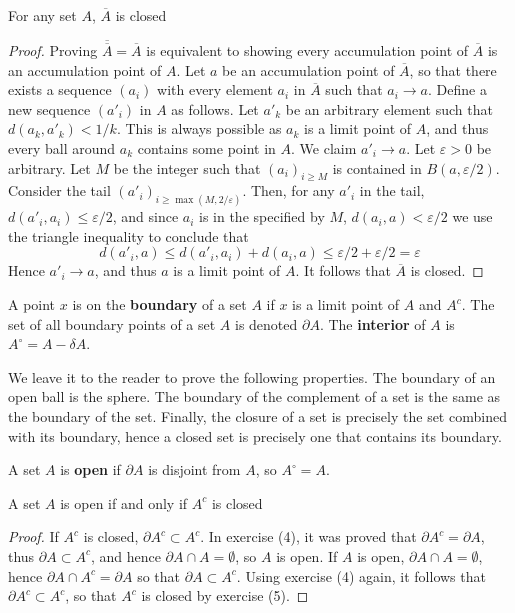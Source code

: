 \begin{lemma}
  For any set $A$, $\overline{A}$ is closed
\end{lemma}
\begin{proof}
  Proving $\overline{\overline{A}} = \overline{A}$ is equivalent to showing every accumulation point of $\overline{A}$ is an accumulation point of $A$. Let $a$ be an accumulation point of $\overline{A}$, so that there exists a sequence $(a_i)$ with every element $a_i$ in $\overline{A}$ such that $a_i \to a$. Define a new sequence $(a'_i)$ in $A$ as follows. Let $a'_k$ be an arbitrary element such that $d(a_k, a'_k) < 1/k$. This is always possible as $a_k$ is a limit point of $A$, and thus every ball around $a_k$ contains some point in $A$. We claim $a'_i \to a$. Let $\varepsilon > 0$ be arbitrary. Let $M$ be the integer such that $(a_i)_{i \geq M}$ is contained in $B(a,\varepsilon/2)$. Consider the tail $(a'_i)_{i \geq \max(M,2/\varepsilon)}$. Then, for any $a'_i$ in the tail, $d(a'_i, a_i) \leq \varepsilon/2$, and since $a_i$ is in the specified by $M$, $d(a_i, a) < \varepsilon/2$ we use the triangle inequality to conclude that
  \[ d(a'_i, a) \leq d(a'_i, a_i) + d(a_i, a) \leq \varepsilon/2 + \varepsilon/2 = \varepsilon \]
  Hence $a'_i \to a$, and thus $a$ is a limit point of $A$. It follows that $\overline{A}$ is closed.
\end{proof}

\begin{definition}
  A point $x$ is on the {\bf boundary} of a set $A$ if $x$ is a limit point of $A$ and $A^c$. The set of all boundary points of a set $A$ is denoted $\partial A$. The {\bf interior} of $A$ is $A^\circ = A - \delta A$.
\end{definition}

We leave it to the reader to prove the following properties. The boundary of an open ball is the sphere. The boundary of the complement of a set is the same as the boundary of the set. Finally, the closure of a set is precisely the set combined with its boundary, hence a closed set is precisely one that contains its boundary.

\begin{definition}
  A set $A$ is {\bf open} if $\partial A$ is disjoint from $A$, so $A^\circ = A$.
\end{definition}

\begin{theorem}
  A set $A$ is open if and only if $A^c$ is closed
\end{theorem}
\begin{proof}
  If $A^c$ is closed, $\partial A^c \subset A^c$. In exercise (4), it was proved that $\partial A^c = \partial A$, thus $\partial A \subset A^c$, and hence $\partial A \cap A = \emptyset$, so $A$ is open. If $A$ is open, $\partial A \cap A = \emptyset$, hence $\partial A \cap A^c = \partial A$ so that $\partial A \subset A^c$. Using exercise (4) again, it follows that $\partial A^c \subset A^c$, so that $A^c$ is closed by exercise (5). 
\end{proof}

